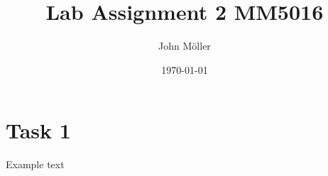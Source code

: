 \documentclass[12pt]{article}
\author{John Möller}
\date{\today}
\title{Lab Assignment 2 MM5016}
\begin{document}
\maketitle

\section{Task 1}
\label{sec:orgd33d52f}

Example text
\end{document}

